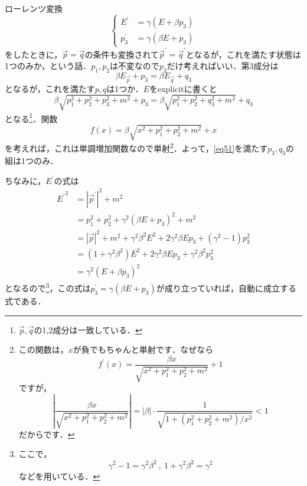 \documentclass[a4paper,pdflatex,ja=standard]{bxjsarticle}
\begin{document}
ローレンツ変換
\begin{equation}
  \left\{
    \begin{alignedat}{1}
      E^{\prime}
      &=  
      \gamma(E+\beta p_{3})
      \\
      p_{3}^{\prime}
      &=
      \gamma(\beta E+p_{3})      
    \end{alignedat}
  \right.
\end{equation}
をしたときに，$\vec{p}=\vec{q}$の条件も変換されて$\vec{p}^{\prime}=\vec{q}^{\prime}$となるが，これを満たす状態は1つのみか，という話．$p_{1},p_{2}$は不変なので$p_{3}$だけ考えればいい．第3成分は
\begin{equation}
  \beta E_{\vec{p}}+p_{3}
  =
  \beta E_{\vec{q}}+q_{3}
\end{equation}
となるが，これを満たす$p,q$は1つか．$E$をexplicitに書くと
\begin{equation}
  \beta \sqrt{p_{1}^{2}+p_{2}^{2}+p_{3}^{2}+m^2}+p_{3}
  =
  \beta \sqrt{p_{1}^{2}+p_{2}^{2}+q_{3}^{2}+m^2}+q_{3}
  \label{eq51}
\end{equation}
となる\footnote{
  $\vec{p},\vec{q}$の1,2成分は一致している．
}．関数
\begin{equation}
  f(x)
  =
  \beta\sqrt{x^2+p_{1}^{2}+p_{2}^{2}+m^2}+x
\end{equation}
を考えれば，これは単調増加関数なので単射\footnote{
  この関数は，$x$が負でもちゃんと単射です．なぜなら
  \begin{equation}
    f^{\prime}(x)
    =
    \frac{\beta x}{\sqrt{x^2+p_{1}^{2}+p_{2}^{2}+m^2}}
    +
    1
    \nonumber
  \end{equation}
  ですが，
  \begin{equation}
    \left|
      \frac{\beta x}{\sqrt{x^2+p_{1}^{2}+p_{2}^{2}+m^2}}
    \right|
    =
    |\beta|
    \cdot
    \frac{1}{\sqrt{1+(p_{1}^{2}+p_{2}^{2}+m^2)/x^2}}
    <
    1
    \nonumber
  \end{equation}
  だからです．
}．よって，\eqref{eq51}を満たす$p_{3},q_{3}$の組は1つのみ．

ちなみに，$E^{\prime}$の式は
  \begin{align}
    {E^{\prime}}^{2}
    &=
    |\vec{p}^{\prime}|^2+m^2
    \nonumber
    \\
    &=
    p_{1}^2
    +
    p_{2}^2
    +
    \gamma^2 (\beta E+p_{3})^2
    +
    m^2
    \nonumber
    \\
    &=
    |\vec{p}|^2
    +
    m^2
    +
    \gamma^2 \beta^2 E^2
    +
    2\gamma^2 \beta E p_{3}
    +
    (\gamma^2-1)p_{3}^2
    \nonumber
    \\
    &=
    (1+\gamma^2\beta^2)E^2
    +
    2\gamma^2 \beta E p_{3}
    +
    \gamma^2 \beta^2 p_{3}^2
    \nonumber
    \\
    &=
    \gamma^2
    (E+\beta p_{3})^2
  \end{align}
となるので\footnote{
  ここで，
  \begin{equation}
    \gamma^2-1
    =
    \gamma^2 \beta^2
    \ ,\ 
    1+\gamma^2 \beta^2
    =
    \gamma^2
    \nonumber
  \end{equation}
  などを用いている．
}，この式は$p_{3}^{\prime}=\gamma(\beta E+p_{3})$が成り立っていれば，自動に成立する式である．
\end{document}
